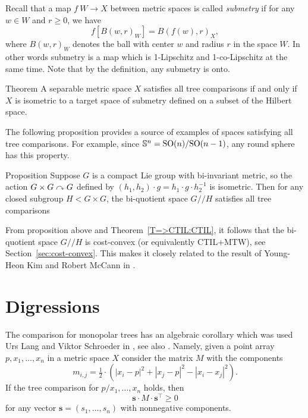 Recall that a map $f\:W\to X$ between metric spaces is called \emph{submetry} if for any $w\in W$ and $r\ge 0$, we have 
\[f[B(w,r)_W]=B(f(w),r)_X,\]
where $B(w,r)_W$ denotes the ball with center $w$ and radius $r$ in the space $W$.
In other words submetry is a map which is 1-Lipschitz and 1-co-Lipschitz at the same time.
Note that by the definition, any submetry is onto.

\begin{thm}{Theorem}\label{thm:hilbert-quotient}
A separable metric space $X$ satisfies all tree comparisons if and only if
$X$ is isometric to a target space of submetry defined on a subset  of the Hilbert space.
\end{thm}

The following proposition provides a source of examples of spaces satisfying all tree comparisons.
For example, since $\mathbb{S}^n=\mathrm{SO}(n)/\mathrm{SO}(n-1)$, any round sphere has this property.


\begin{thm}{Proposition}\label{prop:group}
Suppose $G$ is a compact Lie group with bi-invariant metric, so the action $G\times G\curvearrowright G$ defined by $(h_1,h_2)\cdot g=h_1\cdot g\cdot  h_2^{-1}$ is isometric. 
Then for any closed subgroup $H<G\times G$, the bi-quotient space $G/\!\!/H$ satisfies all tree comparisons
\end{thm}

From proposition above and Theorem~\ref{T=>CTIL:CTIL}, it follows that the bi-quotient space $G/\!\!/H$ is cost-convex (or equivalently CTIL+MTW), see Section~\ref{sec:cost-convex}.
This makes it closely related to the result of Young-Heon Kim and Robert McCann in \cite{kim-mccann}.

\section{Digressions}

The comparison for monopolar trees has an algebraic corollary which was used Urs Lang and Viktor Schroeder in \cite{LS}, see also \cite{sturm}. 
Namely, given a point array $p,x_1,\dots,x_n$ in a metric space $X$ consider the matrix $M$ with the components 
\[m_{i,j}=\tfrac12\cdot(|x_i-p|^2+|x_j-p|^2-|x_i-x_j|^2).\]
If the tree comparison for $p/x_1,\dots,x_n$ holds, then 
\[\bm{s}\cdot M\cdot \bm{s}^\top\ge 0\]
for any vector $\bm{s}=(s_1,\dots,s_n)$ with nonnegative components.

